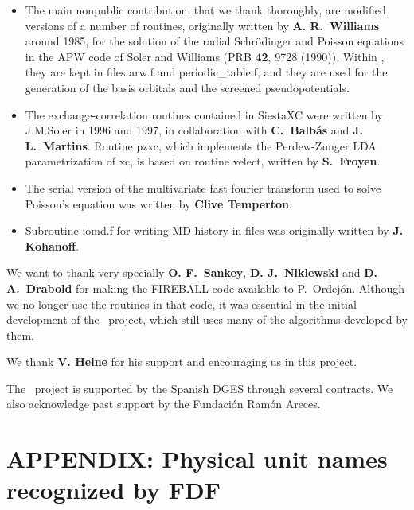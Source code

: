 \begin{itemize}
  \item%
  The main nonpublic contribution, that we thank thoroughly, are
  modified versions of a number of routines, originally written by
  \textbf{A. R.\ Williams} around 1985, for the solution of the radial
  Schr\"odinger and Poisson equations in the APW code of Soler and
  Williams (PRB \textbf{42}, 9728 (1990)).  Within \siesta, they are
  kept in files arw.f and periodic\_table.f, and they are used for the
  generation of the basis orbitals and the screened pseudopotentials.

  \item%
  The exchange-correlation routines contained in SiestaXC were written
  by J.M.Soler in 1996 and 1997, in collaboration with
  \textbf{C.\ Balb\'as} and \textbf{J. L.\ Martins}.  Routine pzxc,
  which implements the Perdew-Zunger LDA parametrization of xc, is
  based on routine velect, written by \textbf{S.\ Froyen}.

  \item%
  The serial version of the multivariate fast fourier transform used
  to solve Poisson's equation was written by \textbf{Clive Temperton}.

  \item%
  Subroutine iomd.f for writing MD history in files was originally
  written by \textbf{J. Kohanoff}.

\end{itemize}

We want to thank very specially \textbf{O. F.\ Sankey}, \textbf{D. J.\
    Niklewski} and \textbf{D. A.\ Drabold} for making the FIREBALL
code available to P.\ Ordej\'on.  Although we no longer use the
routines in that code, it was essential in the initial development of
the \siesta\ project, which still uses many of the algorithms
developed by them.

We thank \textbf{V. Heine} for his support and encouraging us in this
project.

The \siesta\ project is supported by the Spanish DGES through
several contracts. We also acknowledge past support by the Fundaci\'on
Ram\'on Areces.



\section{APPENDIX: Physical unit names recognized by FDF}
\label{sec:fdf-units}

